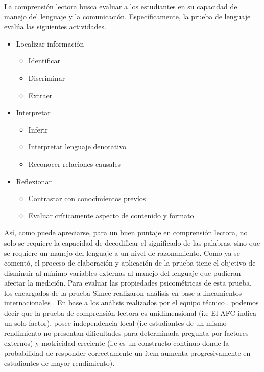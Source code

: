 \documentclass[12pt,twoside]{templates/facsothesis}
\providecommand{\tightlist}{%
  \setlength{\itemsep}{0pt}\setlength{\parskip}{0pt}}
\begin{document}
La comprensión lectora busca evaluar a los estudiantes en su capacidad de manejo del lenguaje y la comunicación. Específicamente, la prueba de lenguaje evalúa las siguientes actividades.

\begin{itemize}
\tightlist
\item
  Localizar información

  \begin{itemize}
  \tightlist
  \item
    Identificar
  \item
    Discriminar
  \item
    Extraer
  \end{itemize}
\item
  Interpretar

  \begin{itemize}
  \tightlist
  \item
    Inferir
  \item
    Interpretar lenguaje denotativo
  \item
    Reconocer relaciones causales
  \end{itemize}
\item
  Reflexionar

  \begin{itemize}
  \tightlist
  \item
    Contrastar con conocimientos previos
  \item
    Evaluar críticamente aspecto de contenido y formato
  \end{itemize}
\end{itemize}

Así, como puede apreciarse, para un buen puntaje en comprensión lectora, no solo se requiere la capacidad de decodificar el significado de las palabras, sino que se requiere un manejo del lenguaje a un nivel de razonamiento. Como ya se comentó, el proceso de elaboración y aplicación de la prueba tiene el objetivo de disminuir al mínimo variables externas al manejo del lenguaje que pudieran afectar la medición. Para evaluar las propiedades psicométricas de esta prueba, los encargados de la prueba Simce realizaron análisis en base a lineamientos internacionales \citep{aera_Report_2011}. En base a los análisis realizados por el equipo técnico \citep{ace_Informe_2018}, podemos decir que la prueba de comprensión lectora es unidimensional (i.e El AFC indica un solo factor), posee independencia local (i.e estudiantes de un mismo rendimiento no presentan dificultades para determinada pregunta por factores externos) y motricidad creciente (i.e es un constructo continuo donde la probabilidad de responder correctamente un ítem aumenta progresivamente en estudiantes de mayor rendimiento).
\end{document}
